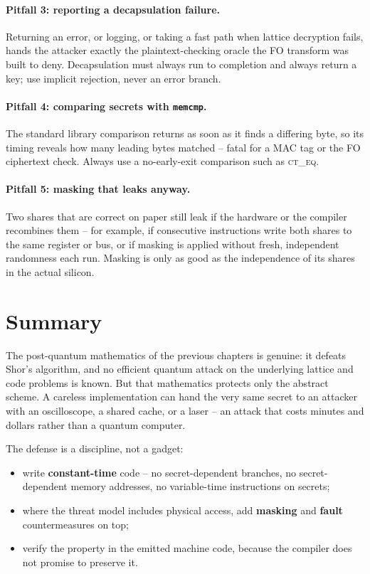 \paragraph{Pitfall 3: reporting a decapsulation failure.}
Returning an error, or logging, or taking a fast path when lattice decryption fails,
hands the attacker exactly the plaintext-checking oracle the FO transform was built to
deny. Decapsulation must always run to completion and always return a key; use implicit
rejection, never an error branch.

\paragraph{Pitfall 4: comparing secrets with \texttt{memcmp}.}
The standard library comparison returns as soon as it finds a differing byte, so its
timing reveals how many leading bytes matched -- fatal for a MAC tag or the FO
ciphertext check. Always use a no-early-exit comparison such as \textsc{ct\_eq}.

\paragraph{Pitfall 5: masking that leaks anyway.}
Two shares that are correct on paper still leak if the hardware or the compiler
recombines them -- for example, if consecutive instructions write both shares to the
same register or bus, or if masking is applied without fresh, independent randomness
each run. Masking is only as good as the independence of its shares in the actual
silicon.

\section{Summary}

The post-quantum mathematics of the previous chapters is genuine: it
defeats Shor's algorithm, and no efficient quantum attack on the underlying lattice
and code problems is known. But that mathematics protects only the abstract scheme. A
careless implementation can hand the very same secret to an attacker with an
oscilloscope, a shared cache, or a laser -- an attack that costs minutes and dollars
rather than a quantum computer.

The defense is a discipline, not a gadget:

\begin{itemize}
  \item write \textbf{constant-time} code -- no secret-dependent branches, no
        secret-dependent memory addresses, no variable-time instructions on secrets;
  \item where the threat model includes physical access, add \textbf{masking} and
        \textbf{fault} countermeasures on top;
  \item verify the property in the emitted machine code, because the compiler does not
        promise to preserve it.
\end{itemize}

